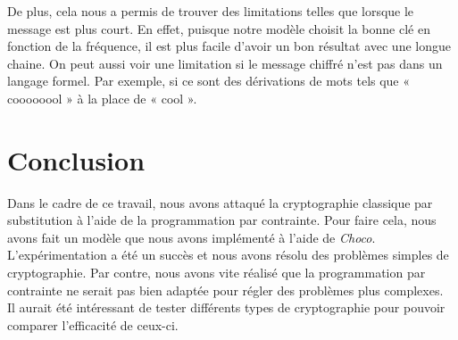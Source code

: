 \documentclass[11pt]{article}
\begin{document}
		De plus, cela nous a permis de trouver des limitations telles que lorsque le message est plus court. En effet, puisque notre modèle choisit la bonne clé en fonction de la fréquence, il est plus facile d'avoir un bon résultat avec une longue chaine. On peut aussi voir une limitation si le message chiffré n'est pas dans un langage formel. Par exemple, si ce sont des dérivations de mots tels que « coooooool » à la place de « cool ».\\

	\section{Conclusion}

		Dans le cadre de ce travail, nous avons attaqué la cryptographie classique par substitution à l'aide de la programmation par contrainte. Pour faire cela, nous avons fait un modèle que nous avons implémenté à l'aide de \emph{Choco}. L'expérimentation a été un succès et nous avons résolu des problèmes simples de cryptographie. Par contre, nous avons vite réalisé que la programmation par contrainte ne serait pas bien adaptée pour régler des problèmes plus complexes.\\

		Il aurait été intéressant de tester différents types de cryptographie pour pouvoir comparer l'efficacité de ceux-ci.\\
\end{document}
